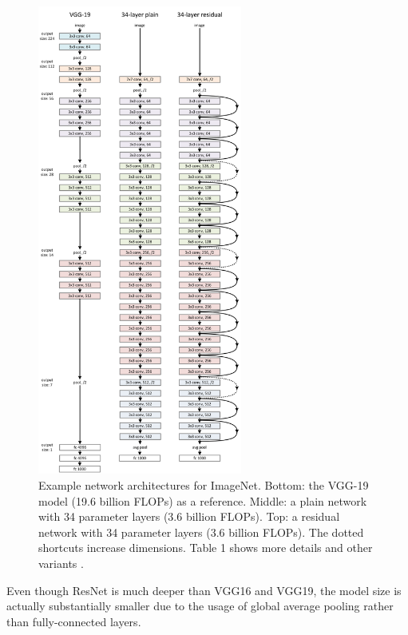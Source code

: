 \begin{figure}[h]
	\includegraphics[width=0.6\textwidth, height=0.65\textheight]{Figures/Section3_Resnet.png} 
	\centering
	\caption{Example network architectures for ImageNet. Bottom: the
		VGG-19 model \cite{simonyan2014very} (19.6 billion FLOPs) as a reference. Middle: a plain network with 34 parameter layers (3.6 billion FLOPs). Top: a residual network with 34 parameter layers (3.6 billion FLOPs). The dotted shortcuts increase dimensions. Table 1 shows more details and other variants \cite{he2016deep}.}
	\label{fig:resnet}
\end{figure}
Even though ResNet is much deeper than VGG16 and VGG19, the model size is actually substantially smaller due to the usage of global average pooling rather than fully-connected layers.
